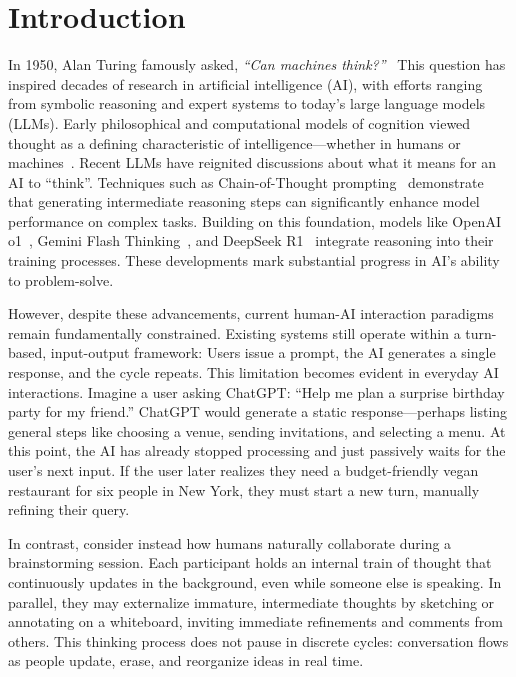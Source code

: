 \section{Introduction}




In 1950, Alan Turing famously asked, \textit{“Can machines think?”}~\cite{Turing1950ComputingMA} This question has inspired decades of research in artificial intelligence (AI), with efforts ranging from symbolic reasoning and expert systems to today’s large language models (LLMs).
Early philosophical and computational models of cognition viewed thought as a defining characteristic of intelligence—whether in humans or machines~\cite{descartes1996discourse, newell1972human, miller2001integrative, raichle2001default}. 
Recent LLMs have reignited discussions about what it means for an AI to ``think''.
Techniques such as Chain-of-Thought prompting~\cite{wei2022chain} demonstrate that generating intermediate reasoning steps can significantly enhance model performance on complex tasks. Building on this foundation, models like OpenAI o1~\cite{jaech2024openai}, Gemini Flash Thinking~\cite{deepmind2025geminiflashthinking}, and DeepSeek R1~\cite{guo2025deepseek} integrate reasoning into their training processes. These developments mark substantial progress in AI’s ability to problem-solve.


However, despite these advancements, current human-AI interaction paradigms remain fundamentally constrained. Existing systems still operate within a turn-based, input-output framework: Users issue a prompt, the AI generates a single response, and the cycle repeats. 
This limitation becomes evident in everyday AI interactions. Imagine a user asking ChatGPT: ``Help me plan a surprise birthday party for my friend.'' 
ChatGPT would generate a static response---perhaps listing general steps like choosing a venue, sending invitations, and selecting a menu. 
At this point, the AI has already stopped processing and just passively waits for the user’s next input. 
If the user later realizes they need a budget-friendly vegan restaurant for six people in New York, they must start a new turn, manually refining their query.

In contrast, consider instead how humans naturally collaborate during a brainstorming session. Each participant holds an internal train of thought that continuously updates in the background, even while someone else is speaking. In parallel, they may externalize immature, intermediate thoughts by sketching or annotating on a whiteboard, inviting immediate refinements and comments from others. This thinking process does not pause in discrete cycles: conversation flows as people update, erase, and reorganize ideas in real time.



